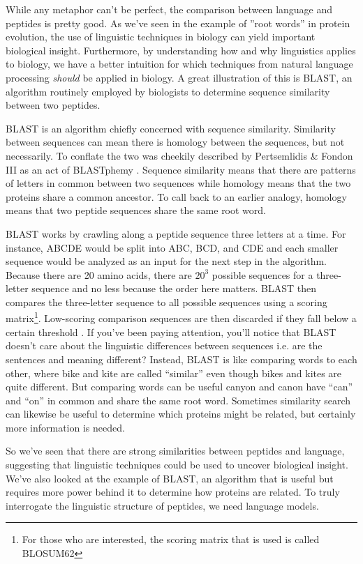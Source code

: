 \documentclass{SBCbookchapter}
\begin{document}
While any metaphor can’t be perfect, the comparison between language and peptides is pretty good. As we’ve seen in the example of ''root words'' in protein evolution, the use of linguistic techniques in 
biology can yield important biological insight. Furthermore, by understanding how and why linguistics applies to biology, we have a better intuition for which techniques from natural language processing 
\textit{should} be applied in biology. A great illustration of this is BLAST, an algorithm routinely employed by biologists to determine sequence similarity between two peptides. 

BLAST is an algorithm chiefly concerned with sequence similarity. Similarity between sequences can mean there is homology between the sequences, but not necessarily. To conflate the two was cheekily 
described by Pertsemlidis \& Fondon III as an act of BLASTphemy \cite{pertsemlidis_having_2001}. Sequence similarity means that there are patterns of letters in common between two sequences while 
homology means that the two proteins share a common ancestor. To call back to an earlier analogy, homology means that two peptide sequences share the same root word. 

BLAST works by crawling along a peptide sequence three letters at a time. For instance, ABCDE would be split into ABC, BCD, and CDE and each smaller sequence would be analyzed as an input for the next 
step in the algorithm. Because there are 20 amino acids, there are $20^3$ possible sequences for a three-letter sequence \textemdash and no less because the order here matters. BLAST then compares the 
three-letter sequence to all possible sequences using a scoring matrix\footnote{For those who are interested, the scoring matrix that is used is called BLOSUM62}. Low-scoring comparison sequences are 
then discarded if they fall below a certain threshold \cite{mount_bioinformatics_nodate}. If you’ve been paying attention, you’ll notice that BLAST doesn’t care about the linguistic differences between 
sequences \textemdash i.e. are the sentences and meaning different? Instead, BLAST is like comparing words to each other, where bike and kite are called “similar” even though bikes and kites are quite 
different. But comparing words can be useful \textemdash canyon and canon have “can” and “on” in common and share the same root word. Sometimes similarity search can likewise be useful to determine 
which proteins might be related, but certainly more information is needed. 

So we’ve seen that there are strong similarities between peptides and language, suggesting that linguistic techniques could be used to uncover biological insight. We’ve also looked at the example of 
BLAST, an algorithm that is useful but requires more power behind it to determine how proteins are related. To truly interrogate the linguistic structure of peptides, we need language models. 
\end{document}
